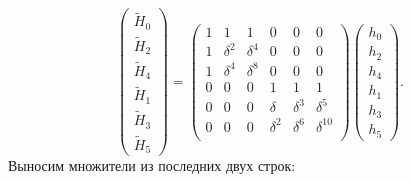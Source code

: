 \[
    \begin{pmatrix}
        \widetilde{H}_0 \\
        \widetilde{H}_2 \\
        \widetilde{H}_4 \\
        \widetilde{H}_1 \\
        \widetilde{H}_3 \\
        \widetilde{H}_5
    \end{pmatrix}
    =
    \begin{pmatrix}
        1 & 1        & 1        & 0        & 0        & 0           \\
        1 & \delta^2 & \delta^4 & 0        & 0        & 0           \\
        1 & \delta^4 & \delta^8 & 0        & 0        & 0           \\
        0 & 0        & 0        & 1        & 1        & 1           \\
        0 & 0        & 0        & \delta   & \delta^3 & \delta^5    \\
        0 & 0        & 0        & \delta^2 & \delta^6 & \delta^{10} \\
    \end{pmatrix}
    \begin{pmatrix}
        h_0 \\
        h_2 \\
        h_4 \\
        h_1 \\
        h_3 \\
        h_5
    \end{pmatrix} .
\]
Выносим множители из последних двух строк:
